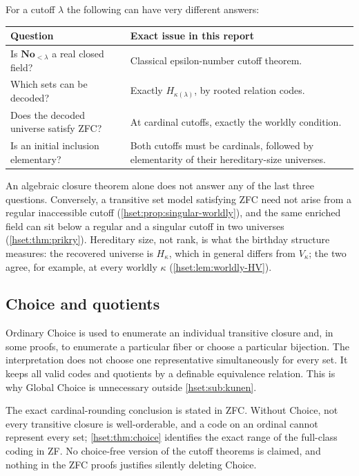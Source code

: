 \documentclass[11pt,letterpaper]{article}
\theoremstyle{definition}
\theoremstyle{remark}
\newcommand{\No}{\mathbf{No}}
\begin{document}
For a cutoff $\lambda$ the following can have very different answers:
\begin{center}
\begin{tabular}{@{}P{0.31\textwidth}P{0.61\textwidth}@{}}
\toprule
Question & Exact issue in this report\\
\midrule
Is $\No_{<\lambda}$ a real closed field? & Classical epsilon-number cutoff theorem.\\[0.35em]
Which sets can be decoded? & Exactly $H_{\kappa(\lambda)}$, by rooted relation codes.\\[0.35em]
Does the decoded universe satisfy ZFC? & At cardinal cutoffs, exactly the worldly condition.\\[0.35em]
Is an initial inclusion elementary? & Both cutoffs must be cardinals, followed by elementarity of their hereditary-size universes.\\
\bottomrule
\end{tabular}
\end{center}
An algebraic closure theorem alone does not answer any of the last three
questions. Conversely, a transitive set model satisfying ZFC need not arise
from a regular inaccessible cutoff (\cref{hset:prop:singular-worldly}), and the
same enriched field can sit below a regular and a singular cutoff in two
universes (\cref{hset:thm:prikry}). Hereditary size, not rank, is what the
birthday structure measures: the recovered universe is $H_\kappa$, which in
general differs from $V_\kappa$; the two agree, for example, at every worldly
$\kappa$ (\cref{hset:lem:worldly-HV}).

\subsection{Choice and quotients}

Ordinary Choice is used to enumerate an individual transitive closure and, in
some proofs, to enumerate a particular fiber or choose a particular bijection.
The interpretation does not choose one representative simultaneously for every
set. It keeps all valid codes and quotients by a definable equivalence relation.
This is why Global Choice is unnecessary outside \cref{hset:sub:kunen}.

The exact cardinal-rounding conclusion is stated in ZFC. Without Choice, not
every transitive closure is well-orderable, and a code on an ordinal cannot
represent every set; \cref{hset:thm:choice} identifies the exact range of the
full-class coding in ZF. No choice-free version of the cutoff theorems is
claimed, and nothing in the ZFC proofs justifies silently deleting Choice.
\end{document}
